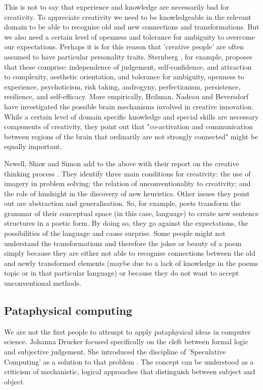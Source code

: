 This is not to say that experience and knowledge are necessarily bad for creativity. To appreciate creativity we need to be knowledgeable in the relevant domain to be able to recognise old and new connections and transformations. But we also need a certain level of openness and tolerance for ambiguity to overcome our expectations. Perhaps it is for this reason that 'creative people' are often assumed to have particular personality traits. Sternberg \citep{Sternberg1988, Sternberg1999}, for example, proposes that these comprise: independence of judgement, self-confidence, and attraction to complexity, aesthetic orientation, and tolerance for ambiguity, openness to experience, psychoticism, risk taking, androgyny, perfectionism, persistence, resilience, and self-efficacy. More empirically, Heilman, Nadeau and Beversdorf \citep{Heilman2003} have investigated the possible brain mechanisms involved in creative innovation. While a certain level of domain specific knowledge and special skills are necessary components of creativity, they point out that "co-activation and communication between regions of the brain that ordinarily are not strongly connected" might be equally important.

Newell, Shaw and Simon add to the above with their report on the creative thinking process \citep{Newell1063}. They identify three main conditions for creativity: the use of imagery in problem solving; the relation of unconventionality to creativity; and the role of hindsight in the discovery of new heuristics. Other issues they point out are abstraction and generalisation. So, for example, poets transform the grammar of their conceptual space (in this case, language) to create new sentence structures in a poetic form. By doing so, they go against the expectations, the possibilities of the language and cause surprise. Some people might not understand the transformations and therefore the jokes or beauty of a poem simply because they are either not able to recognise connections between the old and newly transformed elements (maybe due to a lack of knowledge in the poems topic or in that particular language) or because they do not want to accept unconventional methods.

\subsection{Pataphysical computing}

We are not the first people to attempt to apply pataphysical ideas in computer science. Johanna Drucker focused specifically on the cleft between formal logic and subjective judgement. She introduced the discipline of 'Speculative Computing' as a solution to that problem \citep{Drucker2007}. The concept can be understood as a criticism of mechanistic, logical approaches that distinguish between subject and object.

